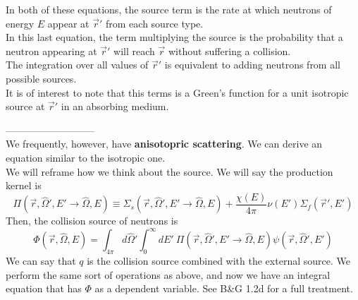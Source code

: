 \documentclass[12pt]{article}
\newcommand{\rvec}{\ensuremath{\vec{r}}}
\newcommand{\vOmega}{\ensuremath{\hat{\Omega}}}
\begin{document}
In both of these equations, the source term is the rate at which neutrons of energy $E$ appear at $\vec{r}'$ from each source type. \\
In this last equation, the term multiplying the source is the probability that a neutron appearing at $\vec{r}'$ will reach $\vec{r}$ without suffering a collision.\\
The integration over all values of $\vec{r}'$ is equivalent to adding neutrons from all possible sources. \\
It is of interest to note that this terms is a Green's function for a unit isotropic source at $\vec{r}'$ in an absorbing medium.

---------------------------\\
We frequently, however, have \textbf{anisotopric scattering}. We can derive an equation similar to the isotropic one.\\
We will reframe how we think about the source. We will say the production kernel is
%
\[\Pi(\rvec, \vOmega',E' \rightarrow \vOmega, E) \equiv \Sigma_s(\rvec, \vOmega',E' \rightarrow \vOmega, E) + \frac{\chi(E)}{4\pi} \nu(E') \Sigma_f(\rvec', E')\]
Then, the collision source of neutrons is
\[\Phi(\vec{r}, \vOmega, E) = \int_{4\pi} d\vOmega' \int_0^{\infty} dE' \: \Pi(\rvec, \vOmega',E' \rightarrow \vOmega, E) \psi(\rvec, \vOmega', E')\]
%
We can say that $q$ is the collision source combined with the external source. We perform the same sort of operations as above, and now we have an integral equation that has $\Phi$ as a dependent variable. See B\&G 1.2d for a full treatment.
\end{document}
